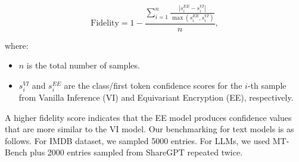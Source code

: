 \documentclass[10pt]{article}
\begin{document}
\begin{equation}
    \text{Fidelity} = 1 - \frac{\sum_{i=1}^{n} \frac{|s_i^{EE} - s_i^{VI}|}{\max(s_i^{EE}, s_i^{VI})}}{n},
\end{equation}

where:
\begin{itemize}
    \item \( n \) is the total number of samples.
    \item \( s_i^{VI} \) and \( s_i^{EE} \) are the class/first token confidence scores for the \( i \)-th sample from Vanilla Inference (VI) and Equivariant Encryption (EE), respectively.
\end{itemize}

A higher fidelity score indicates that the EE model produces confidence values that are more similar to the VI model.  Our benchmarking for text models is as follows. For IMDB dataset, we sampled 5000 entries. For LLMs, we used MT-Bench plus 2000 entries sampled from ShareGPT repeated twice. 

\end{document}
